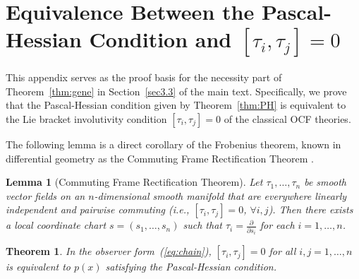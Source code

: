 \documentclass[11pt]{article}
\newtheorem{theorem}{Theorem}
\newtheorem{lemma}{Lemma}
\begin{document}
\section{Equivalence Between the Pascal-Hessian Condition and $[\tau_i,\tau_j]=0$}\label{app2}

This appendix serves as the proof basis for the necessity part of Theorem~\ref{thm:gene} in Section~\ref{sec3.3} of the main text. Specifically, we prove that the Pascal-Hessian condition given by Theorem~\ref{thm:PH} is equivalent to the Lie bracket involutivity condition $[\tau_i,\tau_j]=0$ of the classical OCF theories.

%

The following lemma is a direct corollary of the Frobenius theorem, known in differential geometry as the Commuting Frame Rectification Theorem \cite{Lee2012SmoothManifolds}.

\begin{lemma}[Commuting Frame Rectification Theorem]\label{lem:straightening}
	Let $\tau_1,\ldots,\tau_n$ be smooth vector fields on an $n$-dimensional smooth manifold that are everywhere linearly independent and pairwise commuting (i.e., $[\tau_i,\tau_j]=0$, $\forall i,j$). Then there exists a local coordinate chart $s=(s_1,\ldots,s_n)$ such that $\tau_i=\frac{\partial}{\partial s_i}$ for each $i=1,\ldots,n$.
\end{lemma}

\begin{theorem}\label{thm:Lie_PH_equiv}
	In the observer form~(\ref{eq:chain}), $[\tau_i,\tau_j]=0$ for all $i,j=1,\ldots,n$ is equivalent to $p(x)$ satisfying the Pascal-Hessian condition.
\end{theorem}
\end{document}
